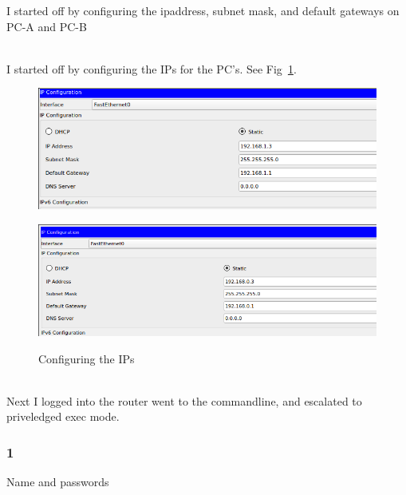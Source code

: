 \documentclass[../EngineeringJournal_CDavis.tex]{subfiles}
\begin{document}
I started off by configuring the ipaddress, subnet mask, and default gateways on PC-A and PC-B
\hfill\break

\noindent{}\\
I started off by configuring the IPs for the PC's. See Fig~\ref{config1}.

\begin{figure}[!hbt]
  \begin{minipage}[c]{0.4\linewidth}
    \centering
      \includegraphics[scale=0.24]{Figures/2020-01-28-093105_710x254_scrot.png}
      \label{config1PC-a}
  \end{minipage}\hfill
  \begin{minipage}[c]{0.4\linewidth}
    \centering
    \includegraphics[scale=0.24]{Figures/2020-01-28-093427_773x256_scrot.png}
    \label{config1PCb}
  \end{minipage}
  \caption{Configuring the IPs}\label{config1}
\end{figure}

\clearpage

\noindent{}\\
Next I logged into the router went to the commandline, and escalated to priveledged exec mode.

\hfill\break

\subsubsection{1}{Name and passwords}
\end{document}
